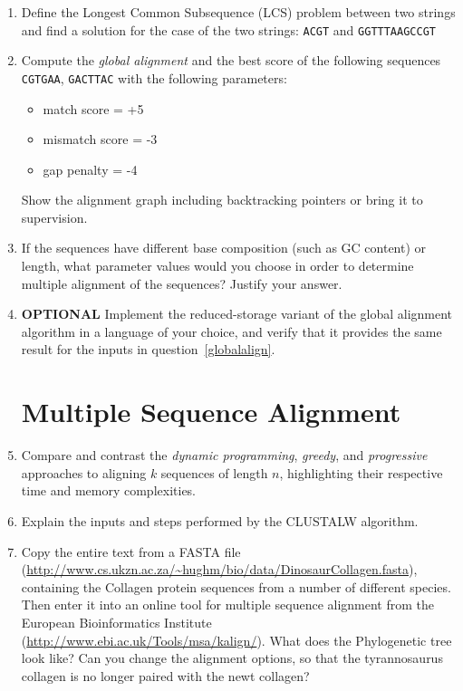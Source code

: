 \documentclass[11pt,runningheads,a4paper]{article}
\newcommand{\DNA}[1]{\texttt{\uppercase{#1}}}
\begin{document}
\begin{enumerate}
\item Define the Longest Common Subsequence (LCS) problem between two strings and find a solution for the case of the two strings: \DNA{ACGT} and \DNA{GGTTTAAGCCGT}

\item \label{globalalign} Compute the \textit{global alignment} and the best score of the following sequences \DNA{CGTGAA}, \DNA{GACTTAC} with the following parameters:
	\begin{itemize}
  	\item match score = +5
  	\item mismatch score = -3
 	 \item gap penalty = -4
	\end{itemize}
Show the alignment graph including backtracking pointers or bring it to supervision.

\item If the sequences have different base composition (such as GC content) or length, what parameter values would you choose in order to determine multiple alignment of the sequences?  Justify your answer.

\item  \textbf{OPTIONAL} Implement the reduced-storage variant of the global alignment algorithm in a language of your choice, and verify that it provides the same result for the inputs in question~\ref{globalalign}.

\section*{Multiple Sequence Alignment}

\item Compare and contrast the \textit{dynamic programming}, \textit{greedy}, and \textit{progressive} approaches to aligning $k$ sequences of length $n$, highlighting their respective time and memory complexities.

\item Explain the inputs and steps performed by the CLUSTALW algorithm.
  
\item Copy the entire text from a FASTA file (\url{http://www.cs.ukzn.ac.za/~hughm/bio/data/DinosaurCollagen.fasta}), containing the Collagen protein sequences from a number of different species. 
  Then enter it into an online tool for multiple sequence alignment from the European Bioinformatics Institute (\url{http://www.ebi.ac.uk/Tools/msa/kalign/}). 
  What does the Phylogenetic tree look like? Can you change the alignment options, so that the tyrannosaurus collagen is no longer paired with the newt collagen?


\end{enumerate}
\end{document}

